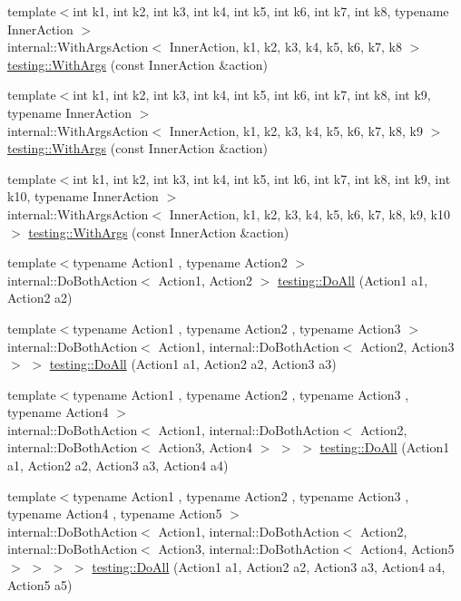 \begin{DoxyCompactItemize}
\item 
{\footnotesize template$<$int k1, int k2, int k3, int k4, int k5, int k6, int k7, int k8, typename Inner\+Action $>$ }\\internal\+::\+With\+Args\+Action$<$ Inner\+Action, k1, k2, k3, k4, k5, k6, k7, k8 $>$ \mbox{\hyperlink{namespacetesting_a16c131c0d58ae07d2e1ee6c7a44aaad1}{testing\+::\+With\+Args}} (const Inner\+Action \&action)
\item 
{\footnotesize template$<$int k1, int k2, int k3, int k4, int k5, int k6, int k7, int k8, int k9, typename Inner\+Action $>$ }\\internal\+::\+With\+Args\+Action$<$ Inner\+Action, k1, k2, k3, k4, k5, k6, k7, k8, k9 $>$ \mbox{\hyperlink{namespacetesting_a6aec78e6c201b150c78271e3f851414e}{testing\+::\+With\+Args}} (const Inner\+Action \&action)
\item 
{\footnotesize template$<$int k1, int k2, int k3, int k4, int k5, int k6, int k7, int k8, int k9, int k10, typename Inner\+Action $>$ }\\internal\+::\+With\+Args\+Action$<$ Inner\+Action, k1, k2, k3, k4, k5, k6, k7, k8, k9, k10 $>$ \mbox{\hyperlink{namespacetesting_a768a620ad07c6b5822201fa4f15fb4f0}{testing\+::\+With\+Args}} (const Inner\+Action \&action)
\item 
{\footnotesize template$<$typename Action1 , typename Action2 $>$ }\\internal\+::\+Do\+Both\+Action$<$ Action1, Action2 $>$ \mbox{\hyperlink{namespacetesting_a5f533932753d2af95000e96c4a3042e3}{testing\+::\+Do\+All}} (Action1 a1, Action2 a2)
\item 
{\footnotesize template$<$typename Action1 , typename Action2 , typename Action3 $>$ }\\internal\+::\+Do\+Both\+Action$<$ Action1, internal\+::\+Do\+Both\+Action$<$ Action2, Action3 $>$ $>$ \mbox{\hyperlink{namespacetesting_ad6a3ce5e229120ea287286a86394d712}{testing\+::\+Do\+All}} (Action1 a1, Action2 a2, Action3 a3)
\item 
{\footnotesize template$<$typename Action1 , typename Action2 , typename Action3 , typename Action4 $>$ }\\internal\+::\+Do\+Both\+Action$<$ Action1, internal\+::\+Do\+Both\+Action$<$ Action2, internal\+::\+Do\+Both\+Action$<$ Action3, Action4 $>$ $>$ $>$ \mbox{\hyperlink{namespacetesting_a790ce08c80a1f8ececa0f2a4f678247c}{testing\+::\+Do\+All}} (Action1 a1, Action2 a2, Action3 a3, Action4 a4)
\item 
{\footnotesize template$<$typename Action1 , typename Action2 , typename Action3 , typename Action4 , typename Action5 $>$ }\\internal\+::\+Do\+Both\+Action$<$ Action1, internal\+::\+Do\+Both\+Action$<$ Action2, internal\+::\+Do\+Both\+Action$<$ Action3, internal\+::\+Do\+Both\+Action$<$ Action4, Action5 $>$ $>$ $>$ $>$ \mbox{\hyperlink{namespacetesting_a794c41d43373d7af9cebbc7f1c5e4a57}{testing\+::\+Do\+All}} (Action1 a1, Action2 a2, Action3 a3, Action4 a4, Action5 a5)

\end{DoxyCompactItemize}
